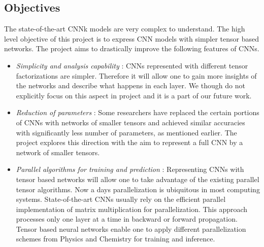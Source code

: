 \documentclass[11pt]{article}
\begin{document}
\subsection{Objectives}
The state-of-the-art CNNk models are very complex to understand. The high level objective of this project is to express CNN models with simpler tensor based networks.  The \prname project aims to drastically improve the following features of CNNs.
\begin{itemize}
	\item \emph{Simplicity and analysis capability} :  CNNs represented with different tensor factorizations are simpler. Therefore it will allow one to gain more insights of the networks and describe what happens in each layer. We though do not explicitly focus on this aspect in \prname project and it is a part of our future work.
	\item \emph{Reduction of parameters} : Some researchers have replaced the certain portions of CNNs with  networks of smaller tensors and achieved  similar accuracies with significantly less number of parameters, as mentioned earlier. The \prname project explores this direction with the aim to represent a full CNN by a network of smaller tensors. 
	\item \emph{Parallel algorithms for training and prediction} : Representing CNNs with tensor based networks will allow one to take advantage of the existing parallel tensor algorithms. Now a days parallelization is ubiquitous in most computing systems. State-of-the-art CNNs usually rely on the efficient parallel implementation of matrix multiplication for parallelization. This approach processes only one layer at a time in backward or forward propagation. Tensor based neural networks enable one to apply different parallelization schemes from Physics and Chemistry for training and inference.
\end{itemize}
\end{document}
